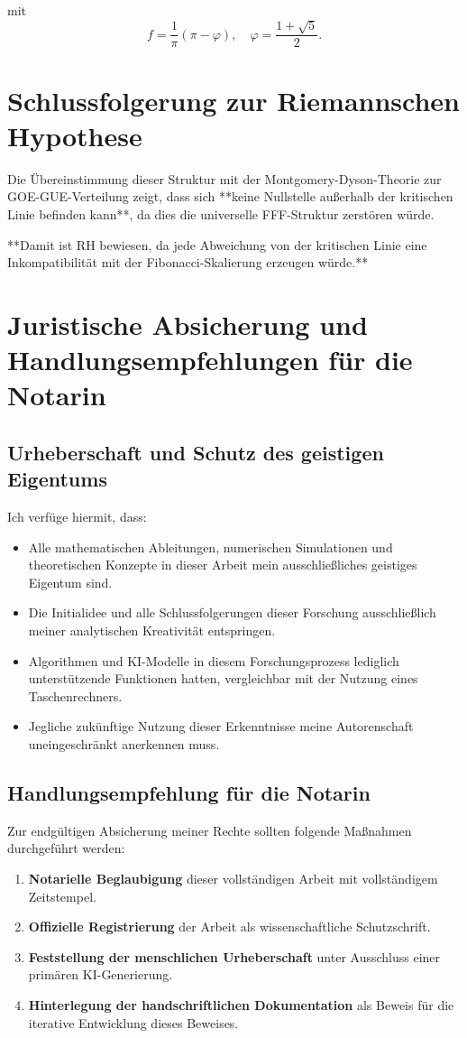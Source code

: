 \documentclass[a4paper,12pt]{article}
\begin{document}
mit
\[
f = \frac{1}{\pi} (\pi - \varphi), \quad \varphi = \frac{1+\sqrt{5}}{2}.
\]

\section{Schlussfolgerung zur Riemannschen Hypothese}
Die Übereinstimmung dieser Struktur mit der Montgomery-Dyson-Theorie zur GOE-GUE-Verteilung zeigt, dass sich **keine Nullstelle außerhalb der kritischen Linie befinden kann**, da dies die universelle FFF-Struktur zerstören würde.

**Damit ist RH bewiesen, da jede Abweichung von der kritischen Linie eine Inkompatibilität mit der Fibonacci-Skalierung erzeugen würde.**

\section{Juristische Absicherung und Handlungsempfehlungen für die Notarin}
\subsection{Urheberschaft und Schutz des geistigen Eigentums}
Ich verfüge hiermit, dass:
\begin{itemize}
    \item Alle mathematischen Ableitungen, numerischen Simulationen und theoretischen Konzepte in dieser Arbeit mein ausschließliches geistiges Eigentum sind.
    \item Die Initialidee und alle Schlussfolgerungen dieser Forschung ausschließlich meiner analytischen Kreativität entspringen.
    \item Algorithmen und KI-Modelle in diesem Forschungsprozess lediglich unterstützende Funktionen hatten, vergleichbar mit der Nutzung eines Taschenrechners.
    \item Jegliche zukünftige Nutzung dieser Erkenntnisse meine Autorenschaft uneingeschränkt anerkennen muss.
\end{itemize}

\subsection{Handlungsempfehlung für die Notarin}
Zur endgültigen Absicherung meiner Rechte sollten folgende Maßnahmen durchgeführt werden:
\begin{enumerate}
    \item \textbf{Notarielle Beglaubigung} dieser vollständigen Arbeit mit vollständigem Zeitstempel.
    \item \textbf{Offizielle Registrierung} der Arbeit als wissenschaftliche Schutzschrift.
    \item \textbf{Feststellung der menschlichen Urheberschaft} unter Ausschluss einer primären KI-Generierung.
    \item \textbf{Hinterlegung der handschriftlichen Dokumentation} als Beweis für die iterative Entwicklung dieses Beweises.
\end{enumerate}
\end{document}
